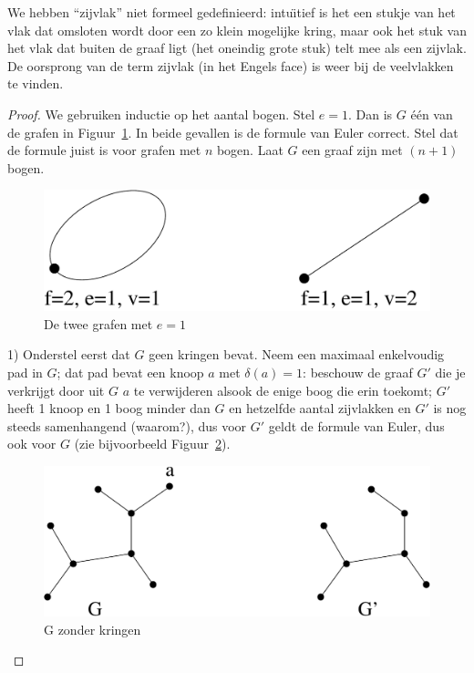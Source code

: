

We hebben ``zijvlak'' niet formeel gedefinieerd: intu\"{\i}tief is het een
stukje van het vlak dat omsloten wordt door een zo klein mogelijke
kring, maar ook het stuk van het vlak dat buiten de graaf ligt (het
oneindig grote stuk) telt mee als een zijvlak. De oorsprong van de term
zijvlak (in het Engels face) is weer bij de veelvlakken te vinden.



\begin{proof} We gebruiken inductie op
het aantal bogen. Stel $e=1$. Dan is $G$ \'{e}\'{e}n van de grafen in
Figuur~\ref{euler1}. In beide gevallen is de formule van Euler correct.
Stel dat de formule juist is voor grafen met $n$ bogen. Laat $G$ een graaf
zijn met $(n+1)$ bogen.

\begin{figure}[ht]
\begin{center}
\includegraphics[width=0.4\linewidth,keepaspectratio]{euler1}
\end{center}
\caption{De twee grafen met $e=1$ \label{euler1}}
\end{figure}

1) Onderstel eerst dat $G$ geen kringen bevat.  Neem een maximaal enkelvoudig pad in
$G$; dat pad bevat een knoop $a$ met $\delta(a) = 1$: beschouw de
graaf $G'$ die je verkrijgt door uit $G$ $a$ te verwijderen alsook de
enige boog die erin toekomt; $G'$ heeft 1 knoop en 1 boog minder dan
$G$ en hetzelfde aantal zijvlakken
en $G'$ is nog steeds samenhangend (waarom?),
dus voor $G'$ geldt de formule van Euler, dus ook voor $G$
(zie bijvoorbeeld Figuur~\ref{euler2}).\\
\begin{figure}[ht]
\begin{center}
\includegraphics[width=0.4\linewidth,keepaspectratio]{euler2}
\end{center}
\caption{G zonder kringen \label{euler2}}
\end{figure}


\end{proof}
